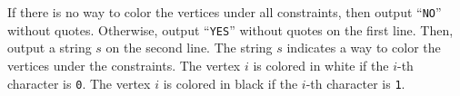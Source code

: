 If there is no way to color the vertices under all constraints, then output
``\verb+NO+'' without quotes.
Otherwise, output ``\verb+YES+'' without quotes on the first line.
Then, output a string $s$ on the second line.
The string $s$ indicates a way to color the vertices under the constraints.
The vertex $i$ is colored in white if the $i$-th character is \verb+0+.
The vertex $i$ is colored in black if the $i$-th character is \verb+1+.
